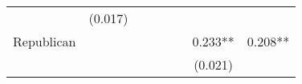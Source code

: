\documentclass[]{article}
\begin{document}
\begin{longtable}[]{@{}lccccccc@{}}
\begin{minipage}[t]{0.10\columnwidth}
\strut
\end{minipage} & \begin{minipage}[t]{0.10\columnwidth}\centering\strut
(0.017)\strut
\end{minipage}\tabularnewline
\begin{minipage}[t]{0.12\columnwidth}\raggedright\strut
Republican\strut
\end{minipage} & \begin{minipage}[t]{0.09\columnwidth}\centering\strut
\strut
\end{minipage} & \begin{minipage}[t]{0.10\columnwidth}\centering\strut
\strut
\end{minipage} & \begin{minipage}[t]{0.10\columnwidth}\centering\strut
\strut
\end{minipage} & \begin{minipage}[t]{0.10\columnwidth}\centering\strut
\strut
\end{minipage} & \begin{minipage}[t]{0.10\columnwidth}\centering\strut
\strut
\end{minipage} & \begin{minipage}[t]{0.10\columnwidth}\centering\strut
0.233**\strut
\end{minipage} & \begin{minipage}[t]{0.10\columnwidth}\centering\strut
0.208**\strut
\end{minipage}\tabularnewline
\begin{minipage}[t]{0.12\columnwidth}\raggedright\strut
\strut
\end{minipage} & \begin{minipage}[t]{0.09\columnwidth}\centering\strut
\strut
\end{minipage} & \begin{minipage}[t]{0.10\columnwidth}\centering\strut
\strut
\end{minipage} & \begin{minipage}[t]{0.10\columnwidth}\centering\strut
\strut
\end{minipage} & \begin{minipage}[t]{0.10\columnwidth}\centering\strut
\strut
\end{minipage} & \begin{minipage}[t]{0.10\columnwidth}\centering\strut
\strut
\end{minipage} & \begin{minipage}[t]{0.10\columnwidth}\centering\strut
(0.021)\strut

\end{minipage}
\end{longtable}
\end{document}

